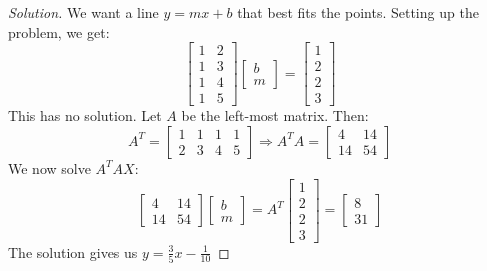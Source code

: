 \documentclass[crop=false,class=book,oneside]{standalone}
\begin{document}
        \begin{proof}[Solution]
        We want a line $y=mx+b$ that best fits the points. Setting up the problem, we get:
        \begin{equation*}
            \begin{bmatrix} 1 & 2 \\ 1 & 3 \\ 1 & 4 \\ 1 & 5 \end{bmatrix} \begin{bmatrix} b \\ m \end{bmatrix} = \begin{bmatrix} 1 \\ 2 \\ 2 \\ 3\end{bmatrix}   
        \end{equation*}
        This has no solution. Let $A$ be the left-most matrix. Then:
        \begin{equation*}
            A^T = \begin{bmatrix} 1 & 1 & 1 & 1 \\ 2 & 3 & 4 & 5 \end{bmatrix}\Rightarrow A^{T}A = \begin{bmatrix} 4 & 14 \\ 14 & 54 \end{bmatrix}
        \end{equation*}
        We now solve $A^{T}AX$:
        \begin{equation*}
            \begin{bmatrix} 4 & 14 \\ 14 & 54 \end{bmatrix} \begin{bmatrix} b \\ m \end{bmatrix} =  A^T \begin{bmatrix} 1 \\ 2 \\ 2 \\ 3 \end{bmatrix} = \begin{bmatrix} 8 \\ 31 \end{bmatrix}   
        \end{equation*}
        The solution gives us $y = \frac{3}{5}x-\frac{1}{10}$
        \end{proof}
\end{document}

